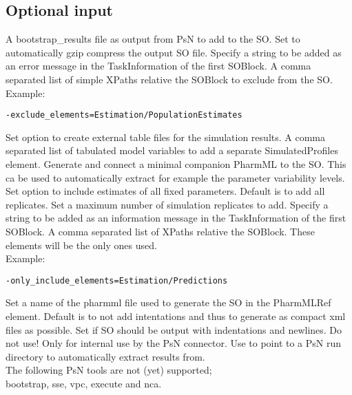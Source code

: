 \subsection{Optional input}

\begin{optionlist}
A bootstrap\_results file as output from PsN to add to the SO.
\nextopt
{}
Set to automatically gzip compress the output SO file.
\nextopt
{}
Specify a string to be added as an error message in the TaskInformation of the first SOBlock.
\nextopt
{}
A comma separated list of simple XPaths relative the SOBlock to exclude from the SO.\\
Example:
\begin{verbatim}
-exclude_elements=Estimation/PopulationEstimates
\end{verbatim}
\nextopt
{}
Set option to create external table files for the simulation results.
\nextopt
{}
A comma separated list of tabulated model variables to add a separate SimulatedProfiles element.
\nextopt
{}
Generate and connect a minimal companion PharmML to the SO. This ca be used to automatically extract for example the parameter variability levels.
\nextopt
{}
Set option to include estimates of all fixed parameters.
\nextopt
{}
Default is to add all replicates. Set a maximum number of simulation replicates to add. 
\nextopt
{}
Specify a string to be added as an information message in the TaskInformation of the first SOBlock.
\nextopt
{}
A comma separated list of XPaths relative the SOBlock. These elements will be the only ones used.\\
Example: 
\begin{verbatim}
-only_include_elements=Estimation/Predictions
\end{verbatim}
\nextopt
{}
Set a name of the pharmml file used to generate the SO in the PharmMLRef element.
\nextopt
{}
Default is to not add intentations and thus to generate as compact xml files as possible. Set if SO should be output with indentations and newlines.
\nextopt
{}
Do not use! Only for internal use by the PsN connector.
\nextopt
{}
Use to point to a PsN run directory to automatically extract results from.\\ The following PsN tools are not (yet) supported;\\ bootstrap, sse, vpc, execute and nca. 

\end{optionlist}
